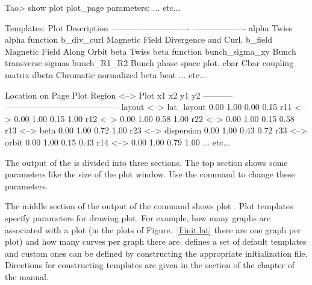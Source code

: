 \documentclass{hitec}
\begin{document}
{\small
\begin{code}
Tao> show plot
plot_page parameters:
... etc...

Templates:
   Plot                                    Description
   ----------------------------            -------------------
   alpha                                   Twiss alpha function
   b_div_curl                              Magnetic Field Divergence and Curl.
   b_field                                 Magnetic Field Along Orbit
   beta                                    Twiss beta function
   bunch_sigma_xy                          Bunch transverse sigmas
   bunch_R1_R2                             Bunch phase space plot.
   cbar                                    Cbar coupling matrix
   dbeta                                   Chromatic normalized beta beat
... etc...

                                               Location on Page
Plot Region         <-->  Plot                 x1    x2    y1    y2
-----------               -----------------------------------------
layout              <-->  lat_layout          0.00  1.00  0.00  0.15
r11                 <-->                      0.00  1.00  0.15  1.00
r12                 <-->                      0.00  1.00  0.58  1.00
r22                 <-->                      0.00  1.00  0.15  0.58
r13                 <-->  beta                0.00  1.00  0.72  1.00
r23                 <-->  dispersion          0.00  1.00  0.43  0.72
r33                 <-->  orbit               0.00  1.00  0.15  0.43
r14                 <-->                      0.00  1.00  0.79  1.00
... etc...
\end{code}}
The output of the  is divided into three sections. The top section
shows some parameters like the size of the plot window. Use the 
command to change these parameters. 

The middle section of the output of the  command shows plot .
Plot templates specify parameters for drawing plot. For example, how many graphs are
associated with a plot (in the plots of Figure.~\ref{f:init.lat} there are one graph per plot)
and how many curves per graph there are. \tao defines a set of default templates and custom
ones can be defined by constructing the appropriate initialization file. Directions for
constructing templates are given in the  section of the  chapter of the \tao manual.
\end{document}
